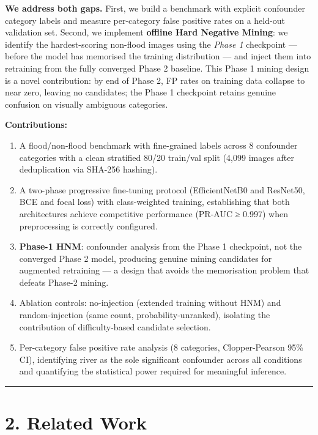 \documentclass[
  11pt,
]{article}
\providecommand{\tightlist}{%
  \setlength{\itemsep}{0pt}\setlength{\parskip}{0pt}}
\begin{document}
\textbf{We address both gaps.} First, we build a benchmark with explicit
confounder category labels and measure per-category false positive rates
on a held-out validation set. Second, we implement \textbf{offline Hard
Negative Mining}: we identify the hardest-scoring non-flood images using
the \emph{Phase 1} checkpoint --- before the model has memorised the
training distribution --- and inject them into retraining from the fully
converged Phase 2 baseline. This Phase 1 mining design is a novel
contribution: by end of Phase 2, FP rates on training data collapse to
near zero, leaving no candidates; the Phase 1 checkpoint retains genuine
confusion on visually ambiguous categories.

\textbf{Contributions:}

\begin{enumerate}
\def\labelenumi{\arabic{enumi}.}
\tightlist
\item
  A flood/non-flood benchmark with fine-grained labels across 8
  confounder categories with a clean stratified 80/20 train/val split
  (4,099 images after deduplication via SHA-256 hashing).
\item
  A two-phase progressive fine-tuning protocol (EfficientNetB0 and
  ResNet50, BCE and focal loss) with class-weighted training,
  establishing that both architectures achieve competitive performance
  (PR-AUC ≥ 0.997) when preprocessing is correctly configured.
\item
  \textbf{Phase-1 HNM}: confounder analysis from the Phase 1 checkpoint,
  not the converged Phase 2 model, producing genuine mining candidates
  for augmented retraining --- a design that avoids the memorisation
  problem that defeats Phase-2 mining.
\item
  Ablation controls: no-injection (extended training without HNM) and
  random-injection (same count, probability-unranked), isolating the
  contribution of difficulty-based candidate selection.
\item
  Per-category false positive rate analysis (8 categories,
  Clopper-Pearson 95\% CI), identifying river as the sole significant
  confounder across all conditions and quantifying the statistical power
  required for meaningful inference.
\end{enumerate}

\begin{center}\rule{0.5\linewidth}{0.5pt}\end{center}

\section{2. Related Work}\label{related-work}
\end{document}
